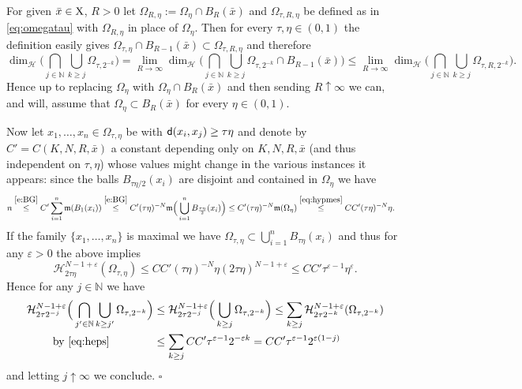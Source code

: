 \documentclass[reqno,11pt]{article}
\numberwithin{equation}{section}
\newcommand{\N}{\mathbb{N}}
\newcommand{\mm}{{\mbox{\boldmath$m$}}}
\newcommand{\sfd}{{\sf d}}
\newcommand{\eps}{\varepsilon}
\renewcommand{\mm}{\mathfrak m}                                %
\renewenvironment{proof}{\removelastskip\par\medskip   %
\noindent{\em Proof} \rm}{\penalty-20\null\hfill$\square$\par\medbreak}
\newcommand{\X}{{\rm X}}
\newcommand{\HH}{{\mathcal H}}
\begin{document}
\begin{proof} {For given $\bar x\in\X$, $R>0$ let $\Omega_{R,\eta}:=\Omega_\eta\cap B_R(\bar x)$ and $\Omega_{\tau,R,\eta}$ be defined as in \eqref{eq:omegatau} with $\Omega_{R,\eta}$ in place of \(\Omega_\eta\). Then for every $\tau,\eta\in(0,1)$ the definition easily gives $\Omega_{\tau,\eta}\cap B_{R-1}(\bar x)\subset \Omega_{\tau,R,\eta}$ and therefore 
\[
\dim_\HH\Big(\bigcap_{j\in\N}\bigcup_{k\geq j}\Omega_{\tau,2^{-k}}\Big)=\lim_{R\to\infty}\dim_\HH\Big(\bigcap_{j\in\N}\bigcup_{k\geq j}\Omega_{\tau,2^{-k}}\cap B_{R-1}(\bar x)\Big)\leq\lim_{R\to\infty}\dim_\HH\Big(\bigcap_{j\in\N}\bigcup_{k\geq j}\Omega_{\tau,R,2^{-k}}\Big).
\]
Hence }up to replacing $\Omega_\eta$ with $\Omega_\eta\cap B_R(\bar x)$ and then sending $R\uparrow\infty$  we can, and will, assume that $\Omega_\eta\subset B_R(\bar x)$ for every $\eta\in(0,1)$.

Now let $x_1,\ldots,x_n\in \Omega_{\tau,\eta}$ be with $\sfd(x_i,x_j)\geq \tau\eta$ and denote by $C'=C(K,N,R,\bar x)$ a constant depending only on $K,N,R,\bar x$ (and thus independent on  $\tau,\eta$) whose values might change in the various instances it appears: since the balls $B_{\tau\eta/2}(x_i)$ are disjoint and  contained in $\Omega_\eta$ we have
\[
\begin{split}
n&\stackrel{\eqref{e:BG}}\leq C'\sum_{i=1}^n\mm(B_1(x_i))\stackrel{\eqref{e:BG}}\leq C'(\tau\eta)^{-N} \mm\Big(\bigcup_{i=1}^nB_{\frac{\tau\eta}2}(x_i)\Big)\leq C' (\tau\eta)^{-N}\mm( \Omega_\eta )\stackrel{\eqref{eq:hypmes}}\leq  CC'(\tau\eta)^{-N}\eta.
\end{split}
\]
If the family $\{x_1,\ldots,x_n\}$ is maximal we have $ \Omega_{\tau,\eta}\subset \bigcup_{i=1}^n B_{\tau\eta }(x_i)$ and thus for any $\eps>0$ the above implies
\begin{equation}
\label{eq:heps}
\HH^{N-1+\eps}_{2\tau\eta}( \Omega_{\tau,\eta})\leq CC'(\tau\eta)^{-N}\eta (2\tau\eta)^{N-1+\eps}\leq CC'\tau^{\eps-1}\eta^\eps.
\end{equation}
Hence for any $j\in\N$ we have
\[
\begin{split}
\HH^{N-1+\eps}_{2\tau 2^{-j}}\Big(\bigcap_{j'\in\N}\bigcup_{k\geq j'}\Omega_{\tau,2^{-k}}\Big)&\leq \HH^{N-1+\eps}_{2\tau 2^{-j}}\Big(\bigcup_{k\geq j}\Omega_{\tau,2^{-k}}\Big)\leq\sum_{k\geq j}\HH^{N-1+\eps}_{2\tau 2^{-k}}(\Omega_{\tau,2^{-k}})\\
\text{by \eqref{eq:heps}}\qquad\qquad&\leq \sum_{k\geq j} CC'\tau^{\eps-1}2^{-\eps k}=CC'\tau^{\eps-1}2^{\eps(1-j)}
\end{split}
\]
and letting $j\uparrow\infty$ we conclude.
\end{proof}
\end{document}
